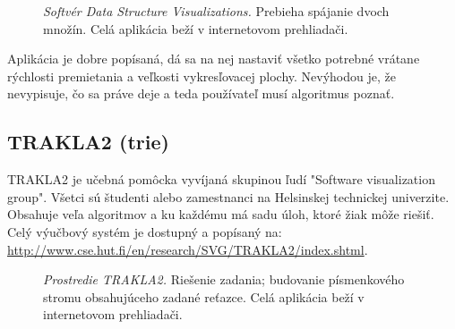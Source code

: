 \begin{figure}
\centering
{}
\caption{\emph{Softvér Data Structure Visualizations.} Prebieha spájanie dvoch 
množín. Celá aplikácia beží v internetovom prehliadači.}
\label{img:vis:galles}
\end{figure}

Aplikácia je dobre popísaná, dá sa na nej nastaviť všetko potrebné vrátane 
rýchlosti premietania a veľkosti vykresľovacej plochy. Nevýhodou je, že 
nevypisuje, čo sa práve deje a teda používateľ musí algoritmus poznať.

\subsection{TRAKLA2 (trie)}\label{sec:trakla}

TRAKLA2 je učebná pomôcka vyvíjaná skupinou ľudí "Software visualization 
group". Všetci sú študenti alebo zamestnanci na Helsinskej technickej 
univerzite. Obsahuje veľa algoritmov a ku každému má sadu úloh, ktoré žiak 
môže riešiť. Celý výučbový systém je dostupný a popísaný na: 
\url{http://www.cse.hut.fi/en/research/SVG/TRAKLA2/index.shtml}.

\begin{figure}
\centering
{}
\caption{\emph{Prostredie TRAKLA2.} Riešenie zadania; budovanie písmenkového 
stromu obsahujúceho zadané reťazce. Celá aplikácia beží v internetovom 
prehliadači.}
\label{img:vis:trakla2}
\end{figure}

